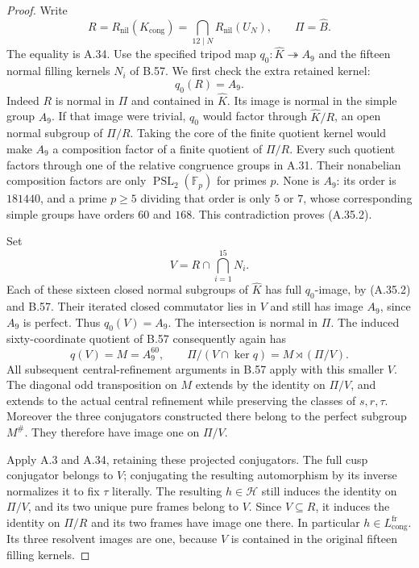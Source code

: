 \begin{proof}
Write
\[
 R=R_{\mathrm{nil}}(K_{\mathrm{cong}})
     =\bigcap_{12\mid N}R_{\mathrm{nil}}(U_N),
       \qquad \Pi=\widehat B.
\]
The equality is A.34. Use the specified tripod map
\(q_0:\widehat K\twoheadrightarrow A_9\) and the
fifteen normal filling kernels \(N_i\) of B.57.
We first check the extra retained kernel:
\[
                         q_0(R)=A_9.
 \tag{A.35.2}
\]
Indeed \(R\) is normal in \(\Pi\) and contained in
\(\widehat K\). Its image is normal in the simple
group \(A_9\). If that image were trivial, \(q_0\)
would factor through \(\widehat K/R\), an open normal
subgroup of \(\Pi/R\). Taking the core of the finite
quotient kernel would make \(A_9\) a composition
factor of a finite quotient of \(\Pi/R\).
Every such quotient factors through one of the relative
congruence groups in A.31. Their nonabelian composition
factors are only \(\operatorname{PSL}_2(\mathbb F_p)\)
for primes \(p\). None is \(A_9\): its order is
\(181440\), and a prime \(p\geq5\) dividing that
order is only \(5\) or \(7\), whose corresponding
simple groups have orders \(60\) and \(168\).
This contradiction proves (A.35.2).

Set
\[
                 V=R\cap\bigcap_{i=1}^{15}N_i.
\]
Each of these sixteen closed normal subgroups of
\(\widehat K\) has full \(q_0\)-image, by (A.35.2)
and B.57. Their iterated closed commutator lies in
\(V\) and still has image \(A_9\), since \(A_9\)
is perfect. Thus \(q_0(V)=A_9\). The intersection
is normal in \(\Pi\). The induced sixty-coordinate
quotient of B.57 consequently again has
\[
 q(V)=M=A_9^{60},\qquad
 \Pi/(V\cap\ker q)=M\rtimes(\Pi/V).
\]
All subsequent central-refinement arguments in B.57
apply with this smaller \(V\). The diagonal odd
transposition on \(M\) extends by the identity on
\(\Pi/V\), and extends to the actual central
refinement while preserving the classes of \(s,r,\tau\).
Moreover the three conjugators constructed there
belong to the perfect subgroup \(M^\#\). They
therefore have image one on \(\Pi/V\).

Apply A.3 and A.34, retaining these projected
conjugators. The full cusp conjugator belongs to
\(V\); conjugating the resulting automorphism by its
inverse normalizes it to fix \(\tau\) literally.
The resulting \(h\in\mathcal H\) still induces the
identity on \(\Pi/V\), and its two unique pure
frames belong to \(V\). Since \(V\subseteq R\),
it induces the identity on \(\Pi/R\) and its two
frames have image one there. In particular
\(h\in L_{\mathrm{cong}}^{\mathrm{fr}}\).
Its three resolvent images are one, because \(V\)
is contained in the original fifteen filling kernels.


\end{proof}

